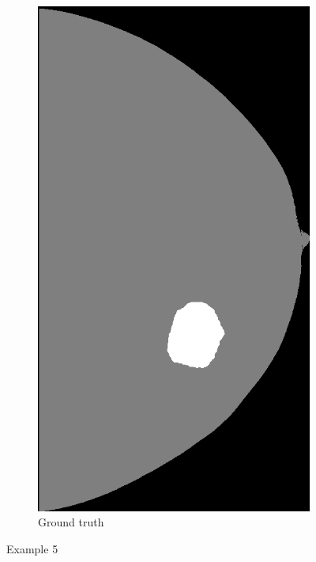 \begin{figure}[h]
\begin{subfigure}{0.2\textwidth}
	\end{subfigure}
	\quad
	\begin{subfigure}{0.2\textwidth}
		\centering
			\includegraphics[width=\textwidth]{plots/examples/label_5.png}
         \caption{Ground truth}
	\end{subfigure}
	\caption[Example 5]{Example 5}
\end{figure}

